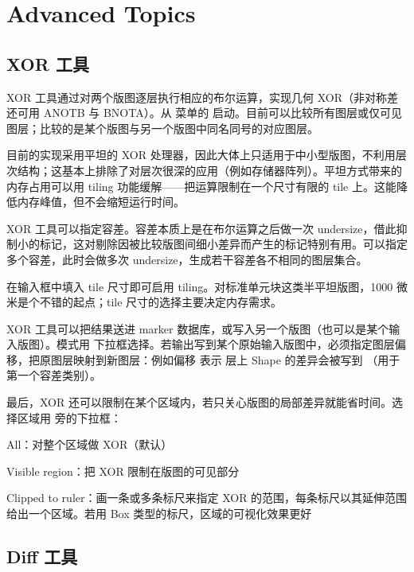 \chapter{Advanced Topics}\label{ch:advanced}

\section{XOR 工具}\label{sec:xor}

XOR 工具通过对两个版图逐层执行相应的布尔运算，实现几何 XOR（非对称差还可用 ANOTB 与 BNOTA）。从  菜单的  启动。目前可以比较所有图层或仅可见图层；比较的是某个版图与另一个版图中同名同号的对应图层。

目前的实现采用平坦的 XOR 处理器，因此大体上只适用于中小型版图，不利用层次结构；这基本上排除了对层次很深的应用（例如存储器阵列）。平坦方式带来的内存占用可以用 tiling 功能缓解——把运算限制在一个尺寸有限的 tile 上。这能降低内存峰值，但不会缩短运行时间。

XOR 工具可以指定容差。容差本质上是在布尔运算之后做一次 undersize，借此抑制小的标记，这对剔除因被比较版图间细小差异而产生的标记特别有用。可以指定多个容差，此时会做多次 undersize，生成若干容差各不相同的图层集合。

在输入框中填入 tile 尺寸即可启用 tiling。对标准单元块这类半平坦版图，1000 微米是个不错的起点；tile 尺寸的选择主要决定内存需求。

XOR 工具可以把结果送进 marker 数据库，或写入另一个版图（也可以是某个输入版图）。模式用  下拉框选择。若输出写到某个原始输入版图中，必须指定图层偏移，把原图层映射到新图层：例如偏移  表示  层上 Shape 的差异会被写到 （用于第一个容差类别）。

最后，XOR 还可以限制在某个区域内，若只关心版图的局部差异就能省时间。选择区域用  旁的下拉框：

\begin{kldesc}
\item All：对整个区域做 XOR（默认）
\item Visible region：把 XOR 限制在版图的可见部分
\item Clipped to ruler：画一条或多条标尺来指定 XOR 的范围，每条标尺以其延伸范围给出一个区域。若用 Box 类型的标尺，区域的可视化效果更好
\end{kldesc}

\section{Diff 工具}\label{sec:diff}

